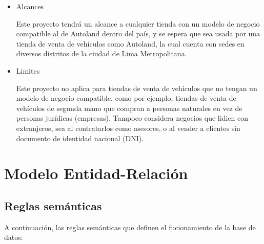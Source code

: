 \documentclass[12pt]{article}
\begin{document}
\begin{itemize}

\item Alcances

Este proyecto tendrá un alcance a cualquier tienda con un modelo de negocio compatible al de Autoland dentro del país, y se espera que sea usada por una tienda de venta de vehículos como Autoland, la cual cuenta con sedes en diversos distritos de la ciudad de Lima Metropolitana.

\item Limites

Este proyecto no aplica para tiendas de venta de vehículos que no tengan un modelo de negocio compatible, como por ejemplo, tiendas de venta de vehículos de segunda mano que compran a personas naturales en vez de personas jurídicas (empresas). Tampoco considera negocios que lidien con extranjeros, sea al contratarlos como asesores, o al vender a clientes sin documento de identidad nacional (DNI).


\end{itemize}


\section{Modelo Entidad-Relaci\'on}

\subsection{Reglas sem\'anticas}

A continuación, las reglas semánticas que definen el fucionamiento de la base de datos:
\end{document}
